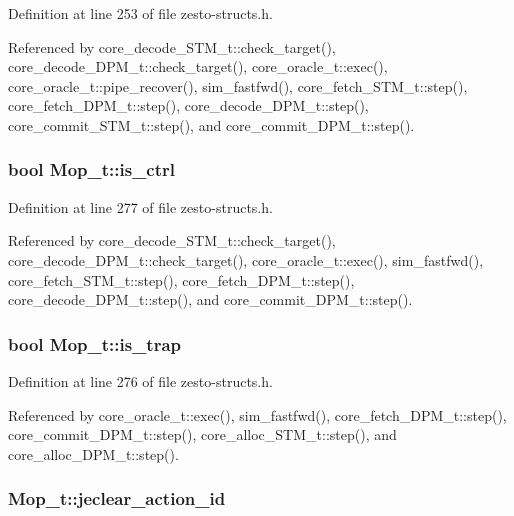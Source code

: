 Definition at line 253 of file zesto-structs.h.

Referenced by core\_\-decode\_\-STM\_\-t::check\_\-target(), core\_\-decode\_\-DPM\_\-t::check\_\-target(), core\_\-oracle\_\-t::exec(), core\_\-oracle\_\-t::pipe\_\-recover(), sim\_\-fastfwd(), core\_\-fetch\_\-STM\_\-t::step(), core\_\-fetch\_\-DPM\_\-t::step(), core\_\-decode\_\-DPM\_\-t::step(), core\_\-commit\_\-STM\_\-t::step(), and core\_\-commit\_\-DPM\_\-t::step().
\subsubsection[{is\_\-ctrl}]{\setlength{\rightskip}{0pt plus 5cm}bool {\bf Mop\_\-t::is\_\-ctrl}}\label{structMop__t_64bb9f9c135012445c43e8823e98bb3d}




Definition at line 277 of file zesto-structs.h.

Referenced by core\_\-decode\_\-STM\_\-t::check\_\-target(), core\_\-decode\_\-DPM\_\-t::check\_\-target(), core\_\-oracle\_\-t::exec(), sim\_\-fastfwd(), core\_\-fetch\_\-STM\_\-t::step(), core\_\-fetch\_\-DPM\_\-t::step(), core\_\-decode\_\-DPM\_\-t::step(), and core\_\-commit\_\-DPM\_\-t::step().
\subsubsection[{is\_\-trap}]{\setlength{\rightskip}{0pt plus 5cm}bool {\bf Mop\_\-t::is\_\-trap}}\label{structMop__t_2ac0786c8628d0e7042cdc07a8d6fcdd}




Definition at line 276 of file zesto-structs.h.

Referenced by core\_\-oracle\_\-t::exec(), sim\_\-fastfwd(), core\_\-fetch\_\-DPM\_\-t::step(), core\_\-commit\_\-DPM\_\-t::step(), core\_\-alloc\_\-STM\_\-t::step(), and core\_\-alloc\_\-DPM\_\-t::step().
\subsubsection[{jeclear\_\-action\_\-id}]{ {\bf Mop\_\-t::jeclear\_\-action\_\-id}}\label{structMop__t_5a1a1b0c85b6d77e4817a5fb68774b09}




